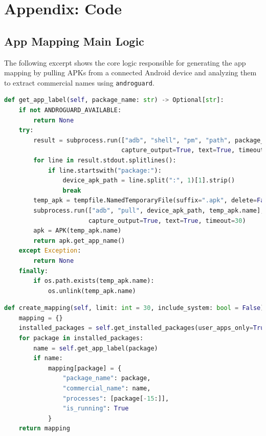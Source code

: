 \documentclass[a4paper,12pt]{report}
\begin{document}
\appendix

\chapter{Appendix: Code}
\label{appendix:app-mapper-code}

\section*{App Mapping Main Logic}

The following excerpt shows the core logic responsible for generating the app mapping by pulling APKs from a connected Android device and analyzing them to extract commercial names using \texttt{androguard}.



\begin{lstlisting}[language=Python]
def get_app_label(self, package_name: str) -> Optional[str]:
    if not ANDROGUARD_AVAILABLE:
        return None
    try:
        result = subprocess.run(["adb", "shell", "pm", "path", package_name],
                                capture_output=True, text=True, timeout=10)
        for line in result.stdout.splitlines():
            if line.startswith("package:"):
                device_apk_path = line.split(":", 1)[1].strip()
                break
        temp_apk = tempfile.NamedTemporaryFile(suffix=".apk", delete=False)
        subprocess.run(["adb", "pull", device_apk_path, temp_apk.name],
                       capture_output=True, text=True, timeout=30)
        apk = APK(temp_apk.name)
        return apk.get_app_name()
    except Exception:
        return None
    finally:
        if os.path.exists(temp_apk.name):
            os.unlink(temp_apk.name)
\end{lstlisting}


\newpage
\begin{lstlisting}[language=Python]
def create_mapping(self, limit: int = 30, include_system: bool = False) -> Dict[str, Dict]:
    mapping = {}
    installed_packages = self.get_installed_packages(user_apps_only=True)
    for package in installed_packages:
        name = self.get_app_label(package)
        if name:
            mapping[package] = {
                "package_name": package,
                "commercial_name": name,
                "processes": [package[-15:]],
                "is_running": True
            }
    return mapping
\end{lstlisting}
\end{document}

